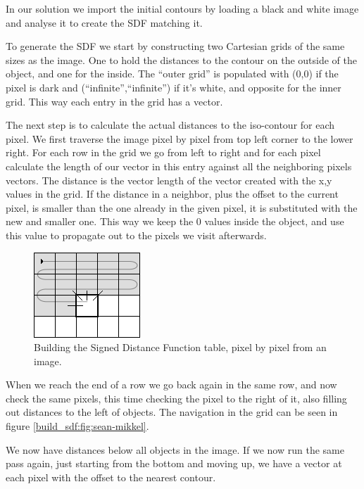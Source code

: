 In our solution we import the initial contours by loading a black and
white image and analyse it to create the SDF matching it. 

To generate the SDF we start by constructing two Cartesian grids of
the same sizes as the image. One to hold the distances to the contour
on the outside of the object, and one for the inside. The ``outer
grid'' is populated with (0,0) if the pixel is dark and
(``infinite'',``infinite'') if it's white, and opposite for the inner
grid. This way each entry in the grid has a vector.

The next step is to calculate the actual distances to the iso-contour
for each pixel. We first traverse the image pixel by pixel from top
left corner to the lower right. For each row in the grid we go from
left to right and for each pixel calculate the length of our vector in
this entry against all the neighboring pixels vectors. The distance is
the vector length of the vector created with the x,y values in the
grid. If the distance in a neighbor, plus the offset to the current
pixel, is smaller than the one already in the given pixel, it is
substituted with the new and smaller one. This way we keep the 0
values inside the object, and use this value to propagate out to the
pixels we visit afterwards.

\begin{figure}[htb]
  \centering
  \includegraphics[scale=0.8]{imgs/sean-mikkel.png}
  \caption{Building the Signed Distance Function table, pixel by pixel from an image.}
  \label{build_sdf:fig:sean-mikkel}
\end{figure}

When we reach the end of a row we go back again in the same row, and
now check the same pixels, this time checking the pixel to the right
of it, also filling out distances to the left of objects. The
navigation in the grid can be seen in
figure \vref{build_sdf:fig:sean-mikkel}.

We now have distances below all objects in the image. If we now run
the same pass again, just starting from the bottom and moving up, we
have a vector at each pixel with the offset to the nearest contour.

